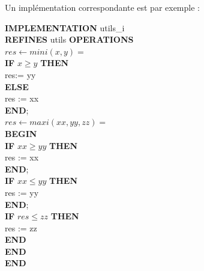 \documentclass[10pt,a4paper]{article}
\begin{document}
{Un implémentation correspondante est par exemple :

\noindent \textbf{IMPLEMENTATION}  utils\_i \\
\textbf{REFINES} utils
\textbf{OPERATIONS} \\
$res \leftarrow mini ( x , y ) =$ \\
\hspace*{1em}    \textbf{IF}  $x \geq y$ \textbf{THEN} \\
\hspace*{2em}        res:= yy \\
\hspace*{1em}    \textbf{ELSE} \\
\hspace*{2em}        res := xx \\
\hspace*{1em}    \textbf{END}; \\
$res \leftarrow maxi ( xx , yy , zz ) = $ \\
\hspace*{1em}    \textbf{BEGIN} \\
\hspace*{1em}    \textbf{IF} $xx \geq yy$ \textbf{THEN} \\
\hspace*{2em}        res := xx \\
\hspace*{1em}    \textbf{END}; \\
\hspace*{1em}   \textbf{IF} $xx \leq yy$  \textbf{THEN} \\
\hspace*{2em}        res := yy \\
\hspace*{1em}    \textbf{END}; \\
\hspace*{1em}   \textbf{IF} $res \leq zz$ \textbf{THEN} \\
\hspace*{2em}        res := zz \\
\hspace*{1em}    \textbf{END} \\
\hspace*{1em}    \textbf{END} \\
\textbf{END}

}
\end{document}
